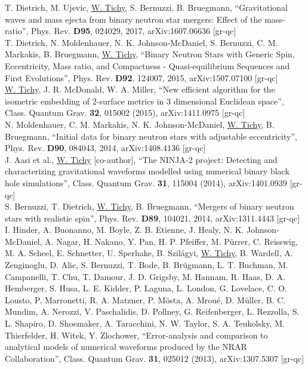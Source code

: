 T. Dietrich, M. Ujevic, \underline{W. Tichy}, S. Bernuzzi, B. Bruegmann,
``Gravitational waves and mass ejecta from binary neutron star mergers:
Effect of the mass-ratio'',
Phys. Rev. {\bf D95}, 024029, 2017,     
arXiv:1607.06636 [gr-qc]
\\

T. Dietrich, N. Moldenhauer, N. K. Johnson-McDaniel, S. Bernuzzi,
C. M. Markakis, B. Bruegmann, \underline{W. Tichy},
``Binary Neutron Stars with Generic Spin, Eccentricity, Mass ratio, and       
Compactness - Quasi-equilibrium Sequences and First Evolutions'',
Phys. Rev. {\bf D92}, 124007, 2015,
arXiv:1507.07100 [gr-qc]
\\

\underline{W. Tichy}, J. R. McDonald, W. A. Miller,
``New efficient algorithm for the isometric embedding of
2-surface metrics in 3 dimensional Euclidean space'',
Class. Quantum Grav. {\bf 32}, 015002 (2015),
arXiv:1411.0975 [gr-qc]
\\

N. Moldenhauer, C. M. Markakis, N. K. Johnson-McDaniel,
\underline{W. Tichy}, B. Bruegmann,
``Initial data for binary neutron stars with adjustable eccentricity'',
Phys. Rev. {\bf D90}, 084043, 2014,
arXiv:1408.4136 [gr-qc]
\\

J. Aasi et al., \underline{W. Tichy} [co-author],
``The NINJA-2 project: Detecting and characterizing gravitational waveforms
modelled using numerical binary black hole simulations'',
Class. Quantum Grav. {\bf 31}, 115004 (2014),
arXiv:1401.0939 [gr-qc]
\\

S. Bernuzzi, T. Dietrich, \underline{W. Tichy}, B. Bruegmann,
``Mergers of binary neutron stars with realistic spin'',
Phys. Rev. {\bf D89}, 104021, 2014,
arXiv:1311.4443 [gr-qc]
\\

I. Hinder, A. Buonanno, M. Boyle, Z. B. Etienne, J. Healy,
N. K. Johnson-McDaniel, A. Nagar, H. Nakano, Y. Pan, H. P. Pfeiffer,
M. Pürrer, C. Reisswig, M. A. Scheel, E. Schnetter, U. Sperhake,
B. Szilágyi, \underline{W. Tichy}, B. Wardell, A. Zenginoglu, D. Alic,
S. Bernuzzi, T. Bode, B. Brügmann, L. T. Buchman, M. Campanelli,
T. Chu, T. Damour, J. D. Grigsby, M. Hannam, R. Haas, D. A. Hemberger,
S. Husa, L. E. Kidder, P. Laguna, L. London, G. Lovelace, C. O. Lousto,
P. Marronetti, R. A. Matzner, P. Mösta, A. Mroué, D. Müller, B. C. Mundim,
A. Nerozzi, V. Paschalidis, D. Pollney, G. Reifenberger, L. Rezzolla,
S. L. Shapiro, D. Shoemaker, A. Taracchini, N. W. Taylor, S. A. Teukolsky,
M. Thierfelder, H. Witek, Y. Zlochower,
``Error-analysis and comparison to analytical models of numerical waveforms
produced by the NRAR Collaboration'',
Class. Quantum Grav. {\bf 31}, 025012 (2013), arXiv:1307.5307 [gr-qc]
\\

